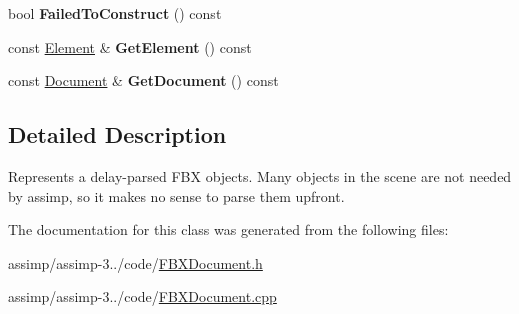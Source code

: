 \begin{DoxyCompactItemize}
\item 
\hypertarget{class_assimp_1_1_f_b_x_1_1_lazy_object_ad1d79ebba07ffaeb487de6323f06138c}{bool {\bfseries Failed\+To\+Construct} () const }\label{class_assimp_1_1_f_b_x_1_1_lazy_object_ad1d79ebba07ffaeb487de6323f06138c}

\item 
\hypertarget{class_assimp_1_1_f_b_x_1_1_lazy_object_a0bdbd6fc9e978e1623c14612e1908681}{const \hyperlink{class_assimp_1_1_f_b_x_1_1_element}{Element} \& {\bfseries Get\+Element} () const }\label{class_assimp_1_1_f_b_x_1_1_lazy_object_a0bdbd6fc9e978e1623c14612e1908681}

\item 
\hypertarget{class_assimp_1_1_f_b_x_1_1_lazy_object_a9d3d9d9499bc89b54f345e2ebe15839c}{const \hyperlink{class_assimp_1_1_f_b_x_1_1_document}{Document} \& {\bfseries Get\+Document} () const }\label{class_assimp_1_1_f_b_x_1_1_lazy_object_a9d3d9d9499bc89b54f345e2ebe15839c}

\end{DoxyCompactItemize}


\subsection{Detailed Description}
Represents a delay-\/parsed F\+B\+X objects. Many objects in the scene are not needed by assimp, so it makes no sense to parse them upfront. 

The documentation for this class was generated from the following files\+:\begin{DoxyCompactItemize}
\item 
assimp/assimp-\/3../code/\hyperlink{_f_b_x_document_8h}{F\+B\+X\+Document.\+h}\item 
assimp/assimp-\/3../code/\hyperlink{_f_b_x_document_8cpp}{F\+B\+X\+Document.\+cpp}\end{DoxyCompactItemize}
